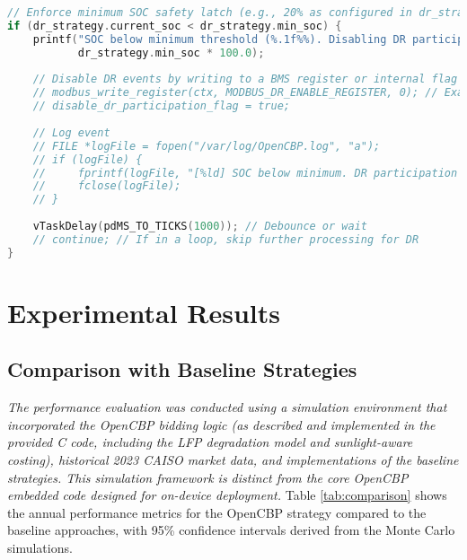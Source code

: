 \documentclass[11pt,a4paper]{article}
\begin{document}
\begin{lstlisting}[language=C, caption=SOC Safety Latch Implementation (Snippet from `SpoofSOC` Task), label=lst:soc-safety]
// Enforce minimum SOC safety latch (e.g., 20% as configured in dr_strategy.min_soc)
if (dr_strategy.current_soc < dr_strategy.min_soc) {
    printf("SOC below minimum threshold (%.1f%%). Disabling DR participation.\n", 
           dr_strategy.min_soc * 100.0);
           
    // Disable DR events by writing to a BMS register or internal flag
    // modbus_write_register(ctx, MODBUS_DR_ENABLE_REGISTER, 0); // Example
    // disable_dr_participation_flag = true;
    
    // Log event
    // FILE *logFile = fopen("/var/log/OpenCBP.log", "a");
    // if (logFile) {
    //     fprintf(logFile, "[%ld] SOC below minimum. DR participation disabled.\n", currentTime);
    //     fclose(logFile);
    // }
    
    vTaskDelay(pdMS_TO_TICKS(1000)); // Debounce or wait
    // continue; // If in a loop, skip further processing for DR
}
\end{lstlisting}

\section{Experimental Results}
\subsection{Comparison with Baseline Strategies}
\textit{The performance evaluation was conducted using a simulation environment that incorporated the OpenCBP bidding logic (as described and implemented in the provided C code, including the LFP degradation model and sunlight-aware costing), historical 2023 CAISO market data, and implementations of the baseline strategies. This simulation framework is distinct from the core OpenCBP embedded code designed for on-device deployment.}
Table \ref{tab:comparison} shows the annual performance metrics for the OpenCBP strategy compared to the baseline approaches, with 95\% confidence intervals derived from the Monte Carlo simulations.
\end{document}
